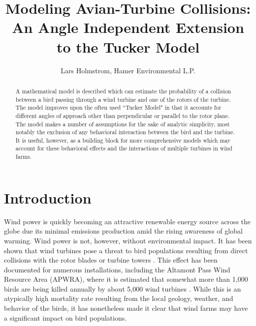 \label{} \documentclass[10pt,conference]{IEEEtran}
\begin{document}
\title{Modeling Avian-Turbine Collisions: An Angle Independent Extension to the Tucker Model}
\author{Lars Holmstrom, Hamer Environmental L.P.}
\maketitle

\begin{abstract}
A mathematical model is described which can estimate the probability of a collision between a bird passing through a
wind turbine and one of the rotors of the turbine. The model improves upon the often used ``Tucker Model" in that it
accounts for different angles of approach other than perpendicular or parallel to the rotor plane. The model makes a
number of assumptions for the sake of analytic simplicity, most notably the exclusion of any behavioral interaction
between the bird and the turbine. It is useful, however, as a building block for more comprehensive models which may
account for these behavioral effects and the interactions of multiple turbines in wind farms.
\end{abstract}

\section{Introduction}
Wind power is quickly becoming an attractive renewable energy source across the globe due its minimal emissions
production amid the rising awareness of global warming. Wind power is not, however, without environmental impact. It
has been shown that wind turbines pose a threat to bird populations resulting from direct collisions with the rotor
blades or turbine towers \cite{Johnson2002}\cite{Johnson2004}. This effect has been documented for numerous
installations, including the Altamont Pass Wind Resource Area (APWRA), where it is estimated that somewhat more than
1,000 birds are being killed annually by about 5,000 wind turbines \cite{Thalender2003}. While this is an atypically
high mortality rate resulting from the local geology, weather, and behavior of the birds, it has nonetheless made it
clear that wind farms may have a significant impact on bird populations.
\end{document}
